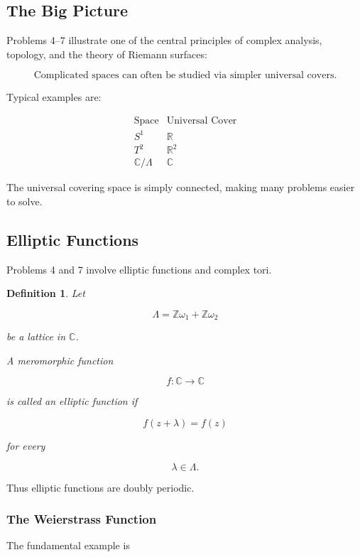 \documentclass[12pt,a4paper]{article}
\theoremstyle{notespace}
\newtheorem{definition}{Definition}[subsection]
\begin{document}
\subsection{The Big Picture}

Problems 4--7 illustrate one of the central principles of complex analysis, topology, and the theory of Riemann surfaces:

\[
\boxed{
	\text{Complicated spaces can often be studied via simpler universal covers.}
}
\]

Typical examples are:

\[
\begin{array}{c|c}
	\text{Space} & \text{Universal Cover} \\ \hline
	S^1 & \mathbb R \\
	T^2 & \mathbb R^2 \\
	\mathbb C/\Lambda & \mathbb C
\end{array}
\]

The universal covering space is simply connected, making many problems easier to solve.

\subsection{Elliptic Functions}

Problems 4 and 7 involve elliptic functions and complex tori.

\begin{definition}
	Let
	
	\[
	\Lambda
	=
	\mathbb Z\omega_1+\mathbb Z\omega_2
	\]
	
	be a lattice in \(\mathbb C\).
	
	A meromorphic function
	
	\[
	f:\mathbb C\to\mathbb C
	\]
	
	is called an \emph{elliptic function} if
	
	\[
	f(z+\lambda)=f(z)
	\]
	
	for every
	
	\[
	\lambda\in\Lambda.
	\]
\end{definition}

Thus elliptic functions are doubly periodic.

\subsubsection*{The Weierstrass Function}

The fundamental example is
\end{document}
